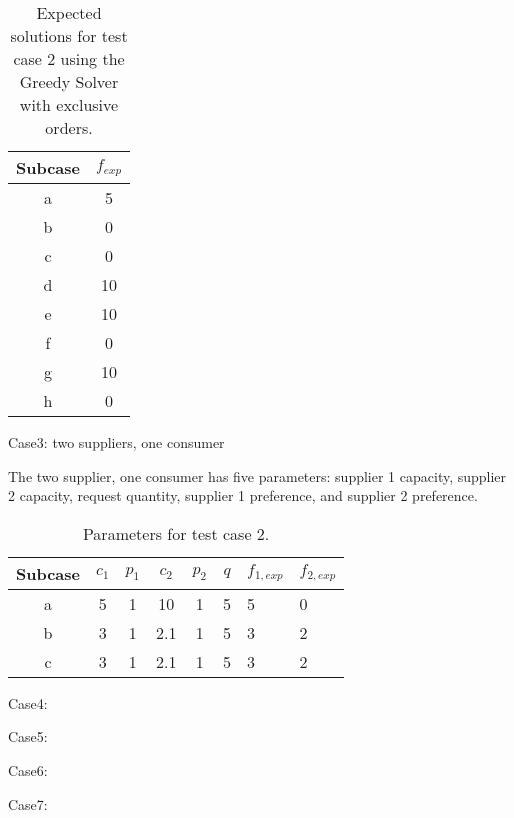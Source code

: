 \begin{table}[ht]
  \begin{center}
    \caption{Expected solutions for test case 2 using the Greedy Solver with 
      exclusive orders.}
    \begin{tabular}{cc}
    \toprule
    Subcase & $f_{exp}$\\
    \midrule
    a & 5  \\
    b & 0  \\
    c & 0  \\
    d & 10 \\
    e & 10 \\
    f & 0  \\
    g & 10 \\
    h & 0  \\
    \bottomrule
    \end{tabular}
  \end{center}
\end{table}

Case3: two suppliers, one consumer

The two supplier, one consumer has five parameters: supplier 1 capacity,
supplier 2 capacity, request quantity, supplier 1 preference, and supplier 2
preference.

\begin{table}[ht]
  \begin{center}
    \caption{Parameters for test case 2.}
    \begin{tabular}{cccccc}
    \toprule
    Subcase & $c_1$ & $p_1$ & $c_2$ & $p_2$ & $q$ & $f_{1, exp}$ & $f_{2, exp}$\\
    \midrule
    a & 5  & 1   & 10  & 1   & 5  & 5  & 0  \\
    b & 3  & 1   & 2.1 & 1   & 5  & 3  & 2  \\
    c & 3  & 1   & 2.1 & 1   & 5  & 3  & 2  \\
    \bottomrule
    \end{tabular}
  \end{center}
\end{table}


Case4:


Case5:

Case6:

Case7:

